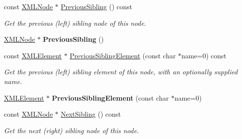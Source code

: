 \begin{DoxyCompactItemize}
const \hyperlink{classCPlantBox_1_1tinyxml2_1_1XMLNode}{X\+M\+L\+Node} $\ast$ \hyperlink{classCPlantBox_1_1tinyxml2_1_1XMLNode_ae6560a99052e567fc52df3c7f53186d0}{Previous\+Sibling} () const
\begin{DoxyCompactList}\small\item\em Get the previous (left) sibling node of this node. \end{DoxyCompactList}\item 
\mbox{\label{classCPlantBox_1_1tinyxml2_1_1XMLNode_a0073b12d841f20c3391384634985bdb3}} 
\hyperlink{classCPlantBox_1_1tinyxml2_1_1XMLNode}{X\+M\+L\+Node} $\ast$ {\bfseries Previous\+Sibling} ()
\item 
\mbox{\label{classCPlantBox_1_1tinyxml2_1_1XMLNode_a63c19112cd850e5cb44325895793fe95}} 
const \hyperlink{classCPlantBox_1_1tinyxml2_1_1XMLElement}{X\+M\+L\+Element} $\ast$ \hyperlink{classCPlantBox_1_1tinyxml2_1_1XMLNode_a63c19112cd850e5cb44325895793fe95}{Previous\+Sibling\+Element} (const char $\ast$name=0) const
\begin{DoxyCompactList}\small\item\em Get the previous (left) sibling element of this node, with an optionally supplied name. \end{DoxyCompactList}\item 
\mbox{\label{classCPlantBox_1_1tinyxml2_1_1XMLNode_a1f6f6ed56f653438c1f1361b56d3dbd9}} 
\hyperlink{classCPlantBox_1_1tinyxml2_1_1XMLElement}{X\+M\+L\+Element} $\ast$ {\bfseries Previous\+Sibling\+Element} (const char $\ast$name=0)
\item 
\mbox{\label{classCPlantBox_1_1tinyxml2_1_1XMLNode_aff402c639911b6a04a8f002a0f88ceac}} 
const \hyperlink{classCPlantBox_1_1tinyxml2_1_1XMLNode}{X\+M\+L\+Node} $\ast$ \hyperlink{classCPlantBox_1_1tinyxml2_1_1XMLNode_aff402c639911b6a04a8f002a0f88ceac}{Next\+Sibling} () const
\begin{DoxyCompactList}\small\item\em Get the next (right) sibling node of this node. \end{DoxyCompactList}\item 
\mbox{\label{classCPlantBox_1_1tinyxml2_1_1XMLNode_a7de2a50f61321d65124b5459d90130d9}} 

\end{DoxyCompactItemize}
